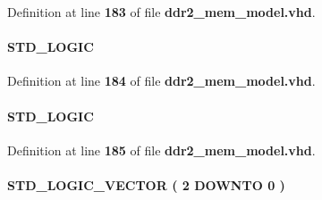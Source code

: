 Definition at line {\bf 183} of file {\bf ddr2\+\_\+mem\+\_\+model.\+vhd}.

\paragraph[{cke}]{ {\bfseries \textcolor{comment}{S\+T\+D\+\_\+\+L\+O\+G\+IC}\textcolor{vhdlchar}{ }} \hspace{0.3cm}{\ttfamily [Signal]}}\label{classddr2__mem__model_1_1europa_a446e41db61337d77265398a33d45cd03}


Definition at line {\bf 184} of file {\bf ddr2\+\_\+mem\+\_\+model.\+vhd}.

\paragraph[{clk}]{ {\bfseries \textcolor{comment}{S\+T\+D\+\_\+\+L\+O\+G\+IC}\textcolor{vhdlchar}{ }} \hspace{0.3cm}{\ttfamily [Signal]}}\label{classddr2__mem__model_1_1europa_aed2cb56a5e81f2bcf0aa5c059163934b}


Definition at line {\bf 185} of file {\bf ddr2\+\_\+mem\+\_\+model.\+vhd}.

\paragraph[{cmd\+\_\+code}]{ {\bfseries \textcolor{comment}{S\+T\+D\+\_\+\+L\+O\+G\+I\+C\+\_\+\+V\+E\+C\+T\+OR}\textcolor{vhdlchar}{ }\textcolor{vhdlchar}{(}\textcolor{vhdlchar}{ }\textcolor{vhdlchar}{ } \textcolor{vhdldigit}{2} \textcolor{vhdlchar}{ }\textcolor{keywordflow}{D\+O\+W\+N\+TO}\textcolor{vhdlchar}{ }\textcolor{vhdlchar}{ } \textcolor{vhdldigit}{0} \textcolor{vhdlchar}{ }\textcolor{vhdlchar}{)}\textcolor{vhdlchar}{ }} \hspace{0.3cm}{\ttfamily [Signal]}}\label{classddr2__mem__model_1_1europa_aae8fe2e51a308734c2f4043c6876ccb3}


